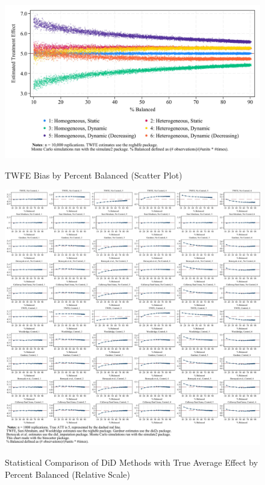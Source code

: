 \documentclass[12pt]{article}
\begin{document}
\begin{figure}
    \centering
    \caption{TWFE Bias by Percent Balanced (Scatter Plot)}
    \includegraphics[width=6in]{Figures/TWFE Bias by Percent Balanced Scatter Crop.jpg}
    \label{fig:scatter-balance}
\end{figure}

\begin{figure}
    \centering
    \caption{Statistical Comparison of DiD Methods with True Average Effect by Percent Balanced (Relative Scale)}
    \includegraphics[width=6in]{Figures/Binscatters by Percent Balanced Relative Scale.jpg}
    \label{fig:bins-relative}
\end{figure}
\end{document}
